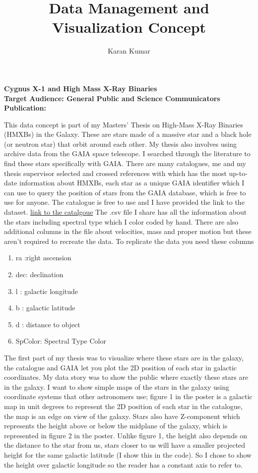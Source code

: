 \documentclass{article}
\title{Data Management and Visualization Concept}
\author{Karan Kumar}
\begin{document}
	
	\maketitle
	
	\begin{center}
		\textbf{Cygnus X-1 and High Mass X-Ray Binaries}\\
		\vspace{1.5cm}
		\textbf{Target Audience: General Public and Science Communicators}
		\textbf{Publication: }
		
	\end{center}
	
	This data concept is part of my Masters' Thesis on High-Mass X-Ray Binaries (HMXBs) in the Galaxy. These are stars made of a massive star and a black hole (or neutron star) that orbit around each other. My thesis also involves using archive data from the GAIA space telescope. I searched through the literature to find these stars specifically with GAIA. There are many catalogues, me and my thesis supervisor selected \cite{Neumann} and crossed references with \cite{Carretero} which has the most up-to-date information about HMXBs, each star as a unique GAIA identifier which I can use to query the position of stars from the GAIA database, which is free to use for anyone. The catalogue is free to use and I have provided the link to the dataset. \href{http://astro.uni-tuebingen.de/~xrbcat/}{link to the catalgoue}
	The .csv file I share has all the information about the stars including spectral type which I color coded by hand. There are also additional columns in the file about velocities, mass and proper motion but these aren't required to recreate the data.
	To replicate the data you need these columns 
	\begin{enumerate}
		\item ra :right ascension
		\item dec: declination
		\item l : galactic longitude
		\item b : galactic latitude
		\item d : distance to object 
		\item SpColor: Spectral Type Color		 
	\end{enumerate}
	The first part of my thesis was to visualize where these stars are in the galaxy, the catalogue and GAIA let you plot the 2D position of each star in galactic coordinates. 
	\newline
	My data story was to show the public where exactly these stars are in the galaxy. I want to show simple maps of the stars in the galaxy using coordinate systems that other astronomers use; figure 1 in the poster is a galactic map in unit degrees to represent the 2D position of each star in the catalogue, the map is an edge on view of the galaxy. Stars also have Z-component which represents the height above or below the midplane of the galaxy, which is represented in figure 2 in the poster. Unlike figure 1, the height also depends on the distance to the star from us, stars closer to us will have a smaller projected height for the same galactic latitude (I show this in the code). So I chose to show the height over galactic longitude so the reader has a constant axis to refer to. 
\end{document}
